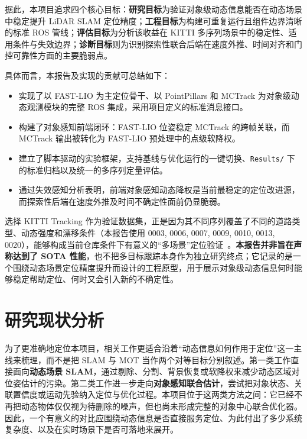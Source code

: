 \documentclass[utf8, a4paper, 12pt]{ctexart}
\begin{document}
据此，本项目追求四个核心目标：\textbf{研究目标}为验证对象级动态信息能否在动态场景中稳定提升 LiDAR SLAM 定位精度；\textbf{工程目标}为构建可重复运行且组件边界清晰的标准 ROS 管线；\textbf{评估目标}为分析该收益在 KITTI 多序列场景中的稳定性、适用条件与失效边界；\textbf{诊断目标}则为识别探索性联合后端在速度外推、时间对齐和门控可靠性方面的主要脆弱点。

具体而言，本报告及实现的贡献可总结如下：
\begin{itemize}[leftmargin=2em]
    \item 实现了以 FAST-LIO 为主定位骨干、以 PointPillars 和 MCTrack 为对象级动态观测模块的完整 ROS 集成，采用项目定义的标准消息接口。
    \item 构建了对象感知前端闭环：FAST-LIO 位姿稳定 MCTrack 的跨帧关联，而 MCTrack 输出被转化为 FAST-LIO 预处理中的点级软降权。
    \item 建立了脚本驱动的实验框架，支持基线与优化运行的一键切换、\texttt{Results/} 下的标准归档以及统一的多序列定量评估。
    \item 通过失效感知分析表明，前端对象感知动态降权是当前最稳定的定位改进源，而探索性后端在速度外推及时间不确定性面前仍显脆弱。
\end{itemize}

选择 KITTI Tracking 作为验证数据集，正是因为其不同序列覆盖了不同的道路类型、动态强度和漂移条件（本报告使用 0003, 0006, 0007, 0009, 0010, 0013, 0020），能够构成当前仓库条件下有意义的“多场景”定位验证~\cite{kitti}。\textbf{本报告并非旨在声称达到了 SOTA 性能}，也不把多目标跟踪本身作为独立研究终点；它记录的是一个围绕动态场景定位精度提升而设计的工程原型，用于展示对象级动态信息何时能够稳定帮助定位、何时又会引入新的不确定性。

\section{研究现状分析}
为了更准确地定位本项目，相关工作更适合沿着“动态信息如何作用于定位”这一主线来梳理，而不是把 SLAM 与 MOT 当作两个对等目标分别叙述。第一类工作直接面向\textbf{动态场景 SLAM}，通过剔除、分割、背景恢复或软降权来减少动态区域对位姿估计的污染。第二类工作进一步走向\textbf{对象感知联合估计}，尝试把对象状态、关联置信度或运动先验纳入定位与优化过程。本项目位于这两类方法之间：它已经不再把动态物体仅仅视为待删除的噪声，但也尚未形成完整的对象中心联合优化器。因此，一个有意义的对比应围绕动态信息是否直接服务定位、为此付出了多少系统复杂度、以及在实时场景下是否可落地来展开。
\end{document}
